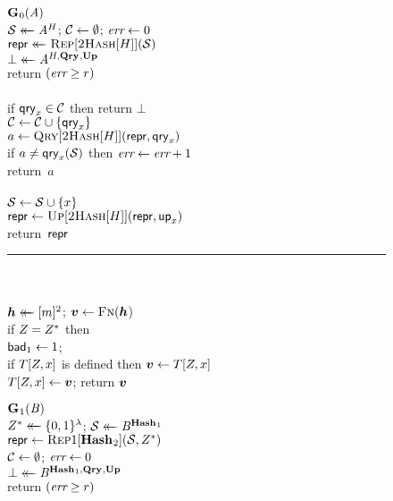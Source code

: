\begin{figure}
  {
    \underline{$\G_0(\advA)$}\\[2pt]
      $\col \getsr \advA^H$; $\setC \gets \emptyset$; $\err \gets 0$\\
      $\pub \getsr \Rep[\hashbf[H]](\col)$\\
      $\bot \getsr \advA^{H,\QRYO,\UPO}$\\
      return $(\err \geq r)$
    \\[6pt]
    \\[2pt]
      if $\qry_x \in \mathcal{C}$ then return $\bot$\\
      $\setC \gets \setC \union \{\qry_x\}$\\
      $a \gets \Qry[\hashbf[H]](\pub, \qry_x)$\\
      if $a \neq \qry_x(\col)$ then $\err \gets \err + 1$\\
      return~$a$
    \\[6pt]
    \\[2pt]
      $\col \gets \col \union \{x\}$\\
      $\pub \gets \Up[\hashbf[H]](\pub,\up_x)$\\
      return~$\pub$
    \\[4pt]
    \hspace*{-4pt}\rule{1.043\textwidth}{.4pt}
    \\[5pt]
     \hfill{}\hspace*{3pt}\\
      $\hh \getsr [m]^2$; $\vv \gets \fff(\hh$)\\
      if $\salt = \salt^*$ then\\
      \tab $\bad_1 \gets 1$; \\
      if $T[\salt,x]$ is defined then $\vv \gets T[\salt,x]$\\
      $T[\salt,x] \gets \vv$;
      return $\vv$
  }
  {
    \underline{$\G_1(\advB)$}\\[2pt]
      $\salt^* \getsr \bits^\lambda$;
      $\col \getsr \advB^{\HASHO_1}$\\
      $\pub \gets \Repx[\HASHO_2](\col, \salt^*)$\\
      $\setC \gets \emptyset$;
      $\err \gets 0$\\
      $\bot \getsr \advB^{\HASHO_1,\QRYO,\UPO}$\\
      return $(\err \geq r)$
    \\[6pt]
}
\end{figure}
